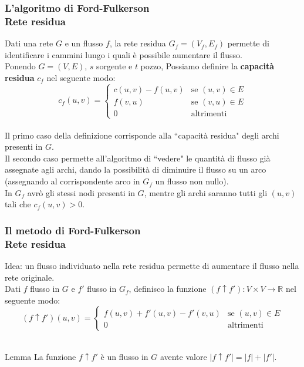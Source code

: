 \documentclass{beamer}
\begin{document}
\begin{frame}
\frametitle{L'algoritmo di Ford-Fulkerson\\Rete residua}
Dati una rete $G$ e un flusso $f$, la rete residua $G_f=(V_f,E_f)$ permette di identificare i cammini lungo i quali è possibile aumentare il flusso.\\
Ponendo $G=(V,E)$, $s$ sorgente e $t$ pozzo, Possiamo definire la \textbf{capacità residua} $c_f$ nel seguente modo:\\
$$c_f(u,v) =
\left\{
	\begin{array}{ll}
		c(u,v)-f(u,v)  & \mbox{se } (u,v)\in E \\
		f(v,u) & \mbox{se } (v,u)\in E \\
		0 & \mbox{altrimenti}
	\end{array}
\right.$$\\
Il primo caso della definizione corrisponde alla ``capacità residua" degli archi presenti in $G$.\\
Il secondo caso permette all'algoritmo di ``vedere" le quantità di flusso già assegnate agli archi, dando la possibilità di diminuire il flusso su un arco (assegnando al corrispondente arco in $G_f$ un flusso non nullo).\\
In $G_f$ avrò gli stessi nodi presenti in $G$, mentre gli archi saranno tutti gli $(u,v)$ tali che $c_f(u,v)>0$.
\end{frame}

\begin{frame}
\frametitle{Il metodo di Ford-Fulkerson\\Rete residua}
Idea: un flusso individuato nella rete residua permette di aumentare il flusso nella rete originale.\\
Dati $f$ flusso in $G$ e $f'$ flusso in $G_f$, definisco la funzione $(f\uparrow f'):V\times V\rightarrow \mathbb{R}$ nel seguente modo:\\
$$(f\uparrow f')(u,v) =
\left\{
	\begin{array}{ll}
		f(u,v)+f'(u,v)-f'(v,u) & \mbox{se } (u,v)\in E \\
		0 & \mbox{altrimenti}
	\end{array}
\right.$$\\
\begin{block}{Lemma}
La funzione $f\uparrow f'$ è un flusso in $G$ avente valore $|f\uparrow f'|=|f|+|f'|$.
\end{block}
\end{frame}
\end{document}
